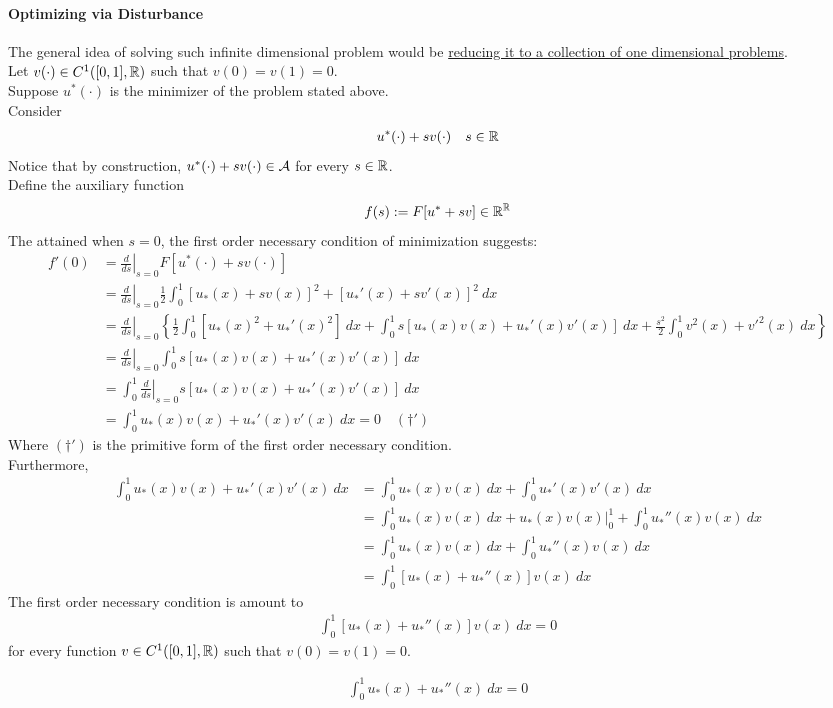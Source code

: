 \documentclass{article}
\begin{document}
	\paragraph{Optimizing via Disturbance} The general idea of solving such infinite dimensional problem would be \ul{reducing it to a collection of one dimensional problems}. \\
	Let $v(\cdot) \in C^1([0, 1], \mathbb{R})$ such that $v(0) = v(1) = 0$. \\
	Suppose $u^*(\cdot)$ is the minimizer of the problem stated above. \\
	Consider
	\begin{align}
		u^*(\cdot) + s v(\cdot)\quad s \in \mathbb{R}
	\end{align}
	Notice that by construction, $u^*(\cdot) + s v(\cdot) \in \mathcal{{A}}$ for every $s \in \mathbb{R}$. \\
	Define the auxiliary function 
	\begin{align}
		f(s) := F[u^* + sv] \in \mathbb{R}^{\mathbb{R}}
	\end{align}
	The attained when $s=0$, the first order necessary condition of minimization suggests:
	\begin{align}
		f'(0) &= \left. \frac{d}{ds} \right|_{s=0} F[u^*(\cdot) + sv(\cdot)] \\
		&= \left. \frac{d}{ds} \right|_{s=0} \frac{1}{2}
		\int_0^1 \left[u_*(x) + sv(x) \right]^2 + \left[u_*'(x) + sv'(x) \right]^2\ dx \\
		&= \left. \frac{d}{ds} \right|_{s=0} \left \{
		\frac{1}{2} \int_0^1 [u_*(x)^2 + u_*'(x)^2]\ dx
		+ \int_0^1 s[u_*(x) v(x) + u_*'(x) v'(x)]\ dx 
		+ \frac{s^2}{2} \int_0^1 v^2(x) + v'^2(x)\ dx
		\right \} \\
		&= \left. \frac{d}{ds} \right|_{s=0} \int_0^1 s[u_*(x) v(x) + u_*'(x) v'(x)]\ dx \\
		&= \int_0^1\left. \frac{d}{ds} \right|_{s=0} s[u_*(x) v(x) + u_*'(x) v'(x)]\ dx \\
		&= \int_0^1 u_*(x) v(x) + u_*'(x) v'(x)\ dx = 0\quad (\dagger')
	\end{align}
	Where $(\dagger')$ is the primitive form of the first order necessary condition. \\
	Furthermore,
	\begin{align}
		\int_0^1 u_*(x) v(x) + u_*'(x) v'(x)\ dx
		&= \int_0^1 u_*(x) v(x)\ dx + \int_0^1 u_*'(x) v'(x)\ dx \\
		&= \int_0^1 u_*(x) v(x)\ dx
		+ \left. u_*(x) v(x) \right|_{0}^1
		+ \int_0^1 u_*''(x) v(x)\ dx \\
		&= \int_0^1 u_*(x) v(x)\ dx
		+ \int_0^1 u_*''(x) v(x)\ dx \\
		&= \int_0^1 [u_*(x) + u_*''(x)] v(x)\ dx
	\end{align}
	The first order necessary condition is amount to
	\begin{align}
		\int_0^1 [u_*(x) + u_*''(x)] v(x)\ dx = 0
	\end{align}
	for every function $v \in C^1([0, 1], \mathbb{R})$ such that $v(0) = v(1) = 0$.
	
	\begin{proposition}
		\begin{align}
			\int_0^1 u_*(x) + u_*''(x)\ dx = 0
		\end{align}
	\end{proposition}
\end{document}
